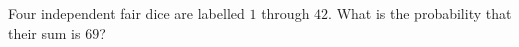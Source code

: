 Four independent fair dice are labelled $1$ through $42$. What is the probability that their sum is $69$?
